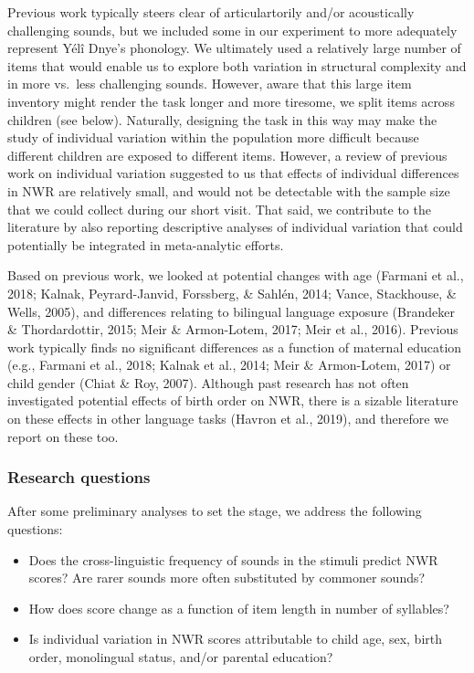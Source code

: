 \documentclass[english,,man,floatsintext]{apa6}
\providecommand{\tightlist}{%
  \setlength{\itemsep}{0pt}\setlength{\parskip}{0pt}}
\begin{document}
Previous work typically steers clear of articulartorily and/or
acoustically challenging sounds, but we included some in our experiment
to more adequately represent Yélî Dnye's phonology. We ultimately used a
relatively large number of items that would enable us to explore both
variation in structural complexity and in more vs.~less challenging
sounds. However, aware that this large item inventory might render the
task longer and more tiresome, we split items across children (see
below). Naturally, designing the task in this way may make the study of
individual variation within the population more difficult because
different children are exposed to different items. However, a review of
previous work on individual variation suggested to us that effects of
individual differences in NWR are relatively small, and would not be
detectable with the sample size that we could collect during our short
visit. That said, we contribute to the literature by also reporting
descriptive analyses of individual variation that could potentially be
integrated in meta-analytic efforts.

Based on previous work, we looked at potential changes with age (Farmani
et al., 2018; Kalnak, Peyrard-Janvid, Forssberg, \& Sahlén, 2014; Vance,
Stackhouse, \& Wells, 2005), and differences relating to bilingual
language exposure (Brandeker \& Thordardottir, 2015; Meir \&
Armon-Lotem, 2017; Meir et al., 2016). Previous work typically finds no
significant differences as a function of maternal education (e.g.,
Farmani et al., 2018; Kalnak et al., 2014; Meir \& Armon-Lotem, 2017) or
child gender (Chiat \& Roy, 2007). Although past research has not often
investigated potential effects of birth order on NWR, there is a sizable
literature on these effects in other language tasks (Havron et al.,
2019), and therefore we report on these too.

\subsubsection{Research questions}\label{research-questions}

After some preliminary analyses to set the stage, we address the
following questions:

\begin{itemize}
\tightlist
\item
  Does the cross-linguistic frequency of sounds in the stimuli predict
  NWR scores? Are rarer sounds more often substituted by commoner
  sounds?
\item
  How does score change as a function of item length in number of
  syllables?
\item
  Is individual variation in NWR scores attributable to child age, sex,
  birth order, monolingual status, and/or parental education?
\end{itemize}
\end{document}
